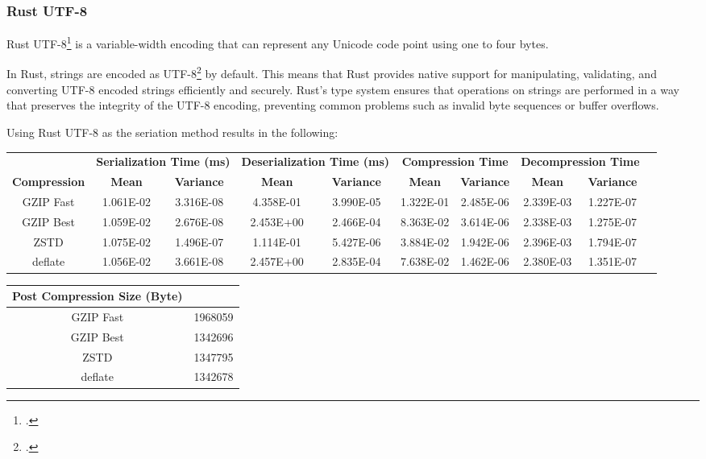 \subsubsection{Rust UTF-8}
Rust UTF-8\footcite{rust_utf8} is a variable-width encoding that can represent any Unicode code point using one to four bytes.

In Rust, strings are encoded as UTF-8\footcite{utf8} by default. This means that Rust provides native support for manipulating, validating, and converting UTF-8 encoded strings efficiently and securely. Rust's type system ensures that operations on strings are performed in a way that preserves the integrity of the UTF-8 encoding, preventing common problems such as invalid byte sequences or buffer overflows.

Using Rust UTF-8 as the seriation method results in the following:

\begin{table}[H]
\scriptsize
\centering
\begin{tabular}{cccccccccc}
\hline
 &
  \multicolumn{2}{c}{\textbf{Serialization Time (ms)}} &
  \multicolumn{2}{c}{\textbf{Deserialization Time (ms)}} &
  \multicolumn{2}{c}{\textbf{Compression Time}} &
  \multicolumn{2}{c}{\textbf{Decompression Time}} &
   \\
\textbf{Compression} & \textbf{Mean}     & \textbf{Variance} & \textbf{Mean}     & \textbf{Variance} & \textbf{Mean}     & \textbf{Variance} & \textbf{Mean}     & \textbf{Variance} \\
\hline
GZIP Fast           & 1.061E-02 & 3.316E-08 & 4.358E-01 & 3.990E-05 & 1.322E-01 & 2.485E-06 & 2.339E-03 & 1.227E-07  \\
GZIP Best           & 1.059E-02 & 2.676E-08 & 2.453E+00 & 2.466E-04 & 8.363E-02 & 3.614E-06 & 2.338E-03 & 1.275E-07  \\
ZSTD                & 1.075E-02 & 1.496E-07 & 1.114E-01 & 5.427E-06 & 3.884E-02 & 1.942E-06 & 2.396E-03 & 1.794E-07  \\
deflate             & 1.056E-02 & 3.661E-08 & 2.457E+00 & 2.835E-04 & 7.638E-02 & 1.462E-06 & 2.380E-03 & 1.351E-07  \\
\hline
\end{tabular}
\end{table}


\begin{table}[H]
\scriptsize
\centering
\begin{tabular}{cc}
\hline
\textbf{Post Compression Size (Byte)} \\
\hline
GZIP Fast           & 1968059 \\
GZIP Best           & 1342696 \\
ZSTD                & 1347795 \\
deflate             & 1342678 \\
\hline
\end{tabular}
\end{table}



